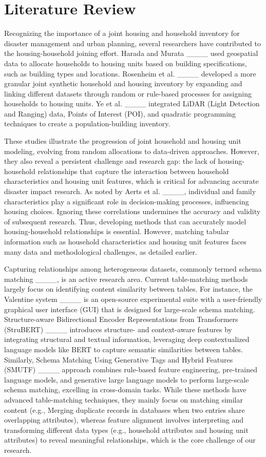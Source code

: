 \section{Literature Review}
Recognizing the importance of a joint housing and household inventory for disaster management and urban planning, several researchers have contributed to the housing-household joining effort. Harada and Murata ____ used geospatial data to allocate households to housing units based on building specifications, such as building types and locations. Rosenheim et al. ____ developed a more granular joint synthetic household and housing inventory by expanding and linking different datasets through random or rule-based processes for assigning households to housing units. Ye et al. ____ integrated LiDAR (Light Detection and Ranging) data, Points of Interest (POI), and quadratic programming techniques to create a population-building inventory. 

These studies illustrate the progression of joint household and housing unit modeling, evolving from random allocations to data-driven approaches. However, they also reveal a persistent challenge and research gap: the lack of housing-household relationships that capture the interaction between household characteristics and housing unit features, which is critical for advancing accurate disaster impact research. As noted by Aerts et al. ____, individual and family characteristics play a significant role in decision-making processes, influencing housing choices. Ignoring these correlations undermines the accuracy and validity of subsequent research. Thus, developing methods that can accurately model housing-household relationships is essential. However, matching tabular information such as household characteristics and housing unit features faces many data and methodological challenges, as detailed earlier. 

Capturing relationships among heterogeneous datasets, commonly termed schema matching ____, is an active research area. Current table-matching methods largely focus on identifying content similarity between tables. For instance, the Valentine system ____ is an open-source experimental suite with a user-friendly graphical user interface (GUI) that is designed for large-scale schema matching. Structure-aware Bidirectional Encoder Representations from Transformers (StruBERT) ____ introduces structure- and context-aware features by integrating structural and textual information, leveraging deep contextualized language models like BERT to capture semantic similarities between tables. Similarly, Schema Matching Using Generative Tags and Hybrid Features (SMUTF) ____ approach combines rule-based feature engineering, pre-trained language models, and generative large language models to perform large-scale schema matching, excelling in cross-domain tasks. While these methods have advanced table-matching techniques, they mainly focus on matching similar content (e.g., Merging duplicate records in databases when two entries share overlapping attributes), whereas feature alignment involves interpreting and transforming different data types (e.g., household attributes and housing unit attributes) to reveal meaningful relationships, which is the core challenge of our research.

